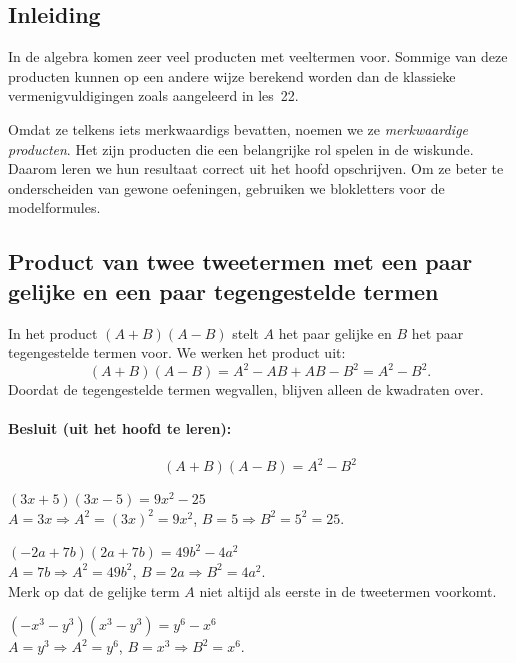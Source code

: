 \documentclass{bis}
\begin{document}

\subsection*{Inleiding}
In de algebra komen zeer veel producten met veeltermen voor. Sommige van deze producten kunnen op een andere wijze berekend worden dan de klassieke vermenigvuldigingen zoals aangeleerd in les~22.

Omdat ze telkens iets merkwaardigs bevatten, noemen we ze \emph{merkwaardige producten}. Het zijn producten die een belangrijke rol spelen in de wiskunde. Daarom leren we hun resultaat correct uit het hoofd opschrijven. Om ze beter te onderscheiden van gewone oefeningen, gebruiken we blokletters voor de modelformules.

\subsection{Product van twee tweetermen met een paar gelijke en een paar tegengestelde termen}
In het product \((A+B)(A-B)\) stelt \(A\) het paar gelijke en \(B\) het paar tegengestelde termen voor. We werken het product uit:
\[
(A+B)(A-B)=A^2-AB+AB-B^2=A^2-B^2.
\]
Doordat de tegengestelde termen wegvallen, blijven alleen de kwadraten over.

\paragraph*{Besluit (uit het hoofd te leren):}
\[
\boxed{(A+B)(A-B)=A^2-B^2}
\]

\begin{voorbeeld}
\((3x+5)(3x-5)=9x^2-25\)\\
\(A=3x\Rightarrow A^2=(3x)^2=9x^2\), \quad \(B=5\Rightarrow B^2=5^2=25\).
\end{voorbeeld}

\begin{voorbeeld}
\(({-}2a+7b)(2a+7b)=49b^2-4a^2\)\\
\(A=7b\Rightarrow A^2=49b^2\), \quad \(B=2a\Rightarrow B^2=4a^2\).\\
Merk op dat de gelijke term \(A\) niet altijd als eerste in de tweetermen voorkomt.
\end{voorbeeld}

\begin{voorbeeld}
\(({-}x^3-y^3)(x^3-y^3)=y^6-x^6\)\\
\(A=y^3\Rightarrow A^2=y^6\), \quad \(B=x^3\Rightarrow B^2=x^6\).
\end{voorbeeld}
\end{document}
